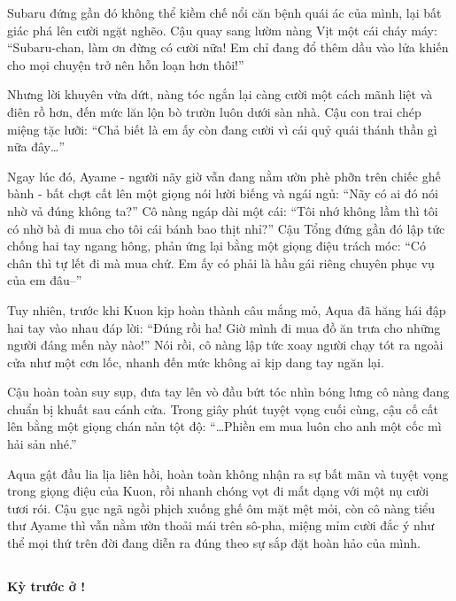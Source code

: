 \documentclass[../main.tex]{subfiles}
\begin{document}
Subaru đứng gần đó không thể kiềm chế nổi căn bệnh quái ác của mình, lại bất giác phá lên cười ngặt nghẽo. Cậu quay sang lườm nàng Vịt một cái cháy máy: ``Subaru-chan, làm ơn đừng có cười nữa! Em chỉ đang đổ thêm dầu vào lửa khiến cho mọi chuyện trở nên hỗn loạn hơn thôi!''

Nhưng lời khuyên vừa dứt, nàng tóc ngắn lại càng cười một cách mãnh liệt và điên rồ hơn, đến mức lăn lộn bò trườn luôn dưới sàn nhà. Cậu con trai chép miệng tặc lưỡi: ``Chả biết là em ấy còn đang cười vì cái quỷ quái thánh thần gì nữa đây\dots''

Ngay lúc đó, Ayame - người nãy giờ vẫn đang nằm ườn phè phỡn trên chiếc ghế bành - bất chợt cất lên một giọng nói lười biếng và ngái ngủ: ``Nãy có ai đó nói nhờ vả đúng không ta?'' Cô nàng ngáp dài một cái: ``Tôi nhớ không lầm thì tôi có nhờ bà đi mua cho tôi cái bánh bao thịt nhỉ?'' Cậu Tổng đứng gần đó lập tức chống hai tay ngang hông, phản ứng lại bằng một giọng điệu trách móc: ``Có chân thì tự lết đi mà mua chứ. Em ấy có phải là hầu gái riêng chuyên phục vụ của em đâu--''

Tuy nhiên, trước khi Kuon kịp hoàn thành câu mắng mỏ, Aqua đã hăng hái đập hai tay vào nhau đáp lời: ``Đúng rồi ha! Giờ mình đi mua đồ ăn trưa cho những người đáng mến này nào!'' Nói rồi, cô nàng lập tức xoay người chạy tót ra ngoài cửa như một cơn lốc, nhanh đến mức không ai kịp dang tay ngăn lại.

Cậu hoàn toàn suy sụp, đưa tay lên vò đầu bứt tóc nhìn bóng lưng cô nàng đang chuẩn bị khuất sau cánh cửa. Trong giây phút tuyệt vọng cuối cùng, cậu cố cất lên bằng một giọng chán nản tột độ: ``\dots Phiền em mua luôn cho anh một cốc mì hải sản nhé.''

Aqua gật đầu lia lịa liên hồi, hoàn toàn không nhận ra sự bất mãn và tuyệt vọng trong giọng điệu của Kuon, rồi nhanh chóng vọt đi mất dạng với một nụ cười tươi rói. Cậu gục ngã ngồi phịch xuống ghế ôm mặt mệt mỏi, còn cô nàng tiểu thư Ayame thì vẫn nằm ườn thoải mái trên sô-pha, miệng mỉm cười đắc ý như thể mọi thứ trên đời đang diễn ra đúng theo sự sắp đặt hoàn hảo của mình.

\subsection*{\label{ep-003.IV}}

\begin{center}
  \textbf{Kỳ trước ở \hll !}
\end{center}
\end{document}

